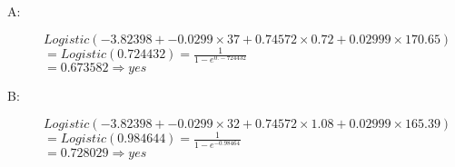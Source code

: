 \documentclass[--SOLUTION-OPTION--]{ditpaper}
\begin{document}
\begin{enumerate}
\begin{answer}
		\begin{description}
		\item[A:] $Logistic(-3.82398+-0.0299\times37+0.74572\times0.72+0.02999\times170.65)$ \\
		$=Logistic(0.724432)   =\frac{1}{1-e^{0.-724432}}$ \\
		$=0.673582 \Rightarrow \textit{yes}$
		\item[B:] $Logistic(-3.82398+-0.0299\times32+0.74572\times1.08+0.02999\times165.39)$ \\
		$=Logistic(0.984644)   =\frac{1}{1-e^{-0.98464}}$ \\
		$=0.728029 \Rightarrow \textit{yes}$
		\end{description}
		\end{answer}


\end{enumerate}
\end{document}
